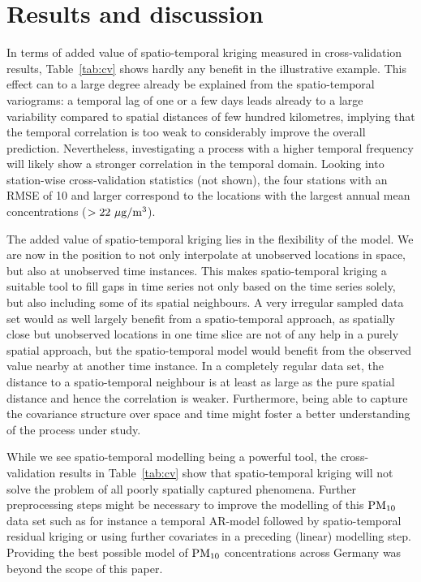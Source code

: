 \section{Results and discussion}\label{sec:resultsDiscuss}

In terms of added value of spatio-temporal kriging measured in cross-validation results, Table~\ref{tab:cv} shows hardly any benefit in the illustrative example. This effect can to a large degree already be explained from the spatio-temporal variograms: a temporal lag of one or a few days leads already to a large variability compared to spatial distances of few hundred kilometres, implying that the temporal correlation is too weak to considerably improve the overall prediction. Nevertheless, investigating a process with a higher temporal frequency will likely show a stronger correlation in the temporal domain. Looking into station-wise cross-validation statistics (not shown), the four stations with an RMSE of 10 and larger correspond to the locations with the largest annual mean concentrations ($>22~\mu{\rm g}/{\rm m}^3$).
 
The added value of spatio-temporal kriging lies in the flexibility of the model. We are now in the position to not only interpolate at unobserved locations in space, but also at unobserved time instances. This makes spatio-temporal kriging a suitable tool to fill gaps in time series not only based on the time series solely, but also including some of its spatial neighbours. A very irregular sampled data set would as well largely benefit from a spatio-temporal approach, as spatially close but unobserved locations in one time slice are not of any help in a purely spatial approach, but the spatio-temporal model would benefit from the observed value nearby at another time instance. In a completely regular data set, the distance to a spatio-temporal neighbour is at least as large as the pure spatial distance and hence the correlation is weaker. Furthermore, being able to capture the covariance structure over space and time might foster a better understanding of the process under study. 

While we see spatio-temporal modelling being a powerful tool, the cross-validation results in Table~\ref{tab:cv} show that spatio-temporal kriging will not solve the problem of all poorly spatially captured phenomena. Further preprocessing steps might be necessary to improve the modelling of this $\rm{PM}_{10}$ data set such as for instance a temporal AR-model followed by spatio-temporal residual kriging or using further covariates in a preceding (linear) modelling step. Providing the best possible model of $\rm{PM}_{10}$ concentrations across Germany was beyond the scope of this paper.

